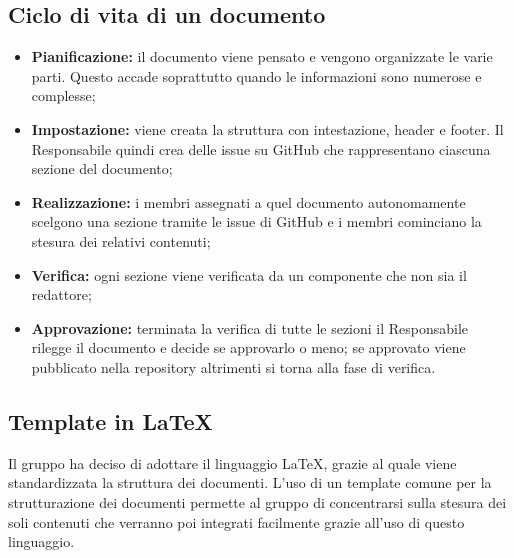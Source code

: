 \subsection{Ciclo di vita di un documento}
\begin{itemize}
    \item \textbf{Pianificazione:} il documento viene pensato e vengono organizzate le varie parti. Questo accade soprattutto quando le informazioni sono numerose e complesse;
    \item \textbf{Impostazione:} viene creata la struttura con intestazione, header e footer. Il Responsabile quindi crea delle issue su GitHub che rappresentano ciascuna sezione del documento;
    \item \textbf{Realizzazione:} i membri assegnati a quel documento autonomamente scelgono una sezione tramite le issue di GitHub e i membri cominciano la stesura dei relativi contenuti;
    \item \textbf{Verifica:} ogni sezione viene verificata da un componente che non sia il redattore;
    \item \textbf{Approvazione:} terminata la verifica di tutte le sezioni il Responsabile rilegge il documento e decide se approvarlo o meno; se approvato viene pubblicato nella repository altrimenti si torna alla fase di verifica.
\end{itemize}
\subsection{Template in \LaTeX}
Il gruppo ha deciso di adottare il linguaggio \LaTeX, grazie al quale viene standardizzata
la struttura dei documenti. L’uso di un template comune per la strutturazione dei documenti permette al gruppo di concentrarsi sulla stesura dei soli contenuti che verranno poi integrati facilmente grazie all'uso di questo linguaggio.
